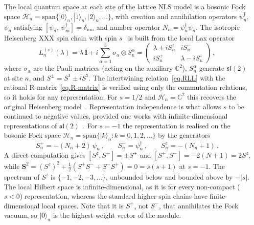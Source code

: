 \documentclass[11pt,a4paper]{article}
\theoremstyle{definition}
\begin{document}
The local quantum space at each site of the lattice NLS model is a bosonic Fock space
$\mathcal{H}_n = \mathrm{span}\{|0\rangle_n, |1\rangle_n,
|2\rangle_n, \ldots\}$, with creation and annihilation operators
$\psi_n^\dagger$, $\psi_n$ satisfying
$[\psi_n,\,\psi_m^\dagger] = \delta_{nm}$ and number operator
$N_n = \psi_n^\dagger \psi_n$.
The isotropic Heisenberg XXX spin chain with spin
$s$~\cite{KulishReshetikhin1981, KirillovReshetikhin1986} is built from the
local Lax operator
\begin{equation}\label{eq.Lax-spin-s}
  L_n^{(s)}(\lambda) = \lambda\,\mathbf{I}
  + i\sum_{\alpha=1}^{3}\sigma_\alpha \otimes S_n^\alpha
  =
  \begin{pmatrix}
    \lambda + i S_n^z & i S_n^- \\
    i S_n^+ & \lambda - i S_n^z
  \end{pmatrix}\,,
\end{equation}
where $\sigma_\alpha$ are the Pauli matrices (acting on the auxiliary
$\mathbb{C}^2$), $S_n^\alpha$ generate $\mathfrak{sl}(2)$ at site $n$, and
$S^\pm = S^1 \pm iS^2$.  The intertwining relation~\eqref{eq.RLL} with the
rational R-matrix~\eqref{eq.R-matrix} is verified using only the commutation
relations, so it holds for any representation.  For $s = 1/2$ and
$\mathcal{H}_n = \mathbb{C}^2$ this recovers the original Heisenberg
model~\cite{Bethe1931}.
Representation independence is what allows $s$ to be continued to negative
values, provided one works with infinite-dimensional representations of
$\mathfrak{sl}(2)$~\cite{HaoEtAl2019}.  For $s = -1$ the representation is
realised on the bosonic Fock space
$\mathcal{H}_n = \mathrm{span}\{|k\rangle_n : k = 0, 1, 2, \ldots\}$
by the generators
\begin{equation}\label{eq.sl2-bosonic}
  S_n^+ = -(N_n + 2)\,\psi_n\,,\qquad
  S_n^- = \psi_n^\dagger\,,\qquad
  S_n^z = -(N_n + 1)\,.
\end{equation}
A direct computation gives $[S^z, S^\pm] = \pm S^\pm$ and
$[S^+, S^-] = -2(N+1) = 2S^z$, while
$\mathbf{S}^2 = (S^z)^2 + \frac{1}{2}(S^+S^- + S^-S^+) = 0 = s(s+1)$
at $s = -1$.  The spectrum of $S^z$ is $\{-1,-2,-3,\ldots\}$, unbounded below
and bounded above by $-|s|$.  The local Hilbert space is infinite-dimensional,
as it is for every non-compact ($s<0$) representation, whereas the standard
higher-spin chains have finite-dimensional local spaces.  Note that it is
$S^+$, not $S^-$, that annihilates the Fock vacuum, so $|0\rangle_n$ is the
highest-weight vector of the module.
\end{document}
